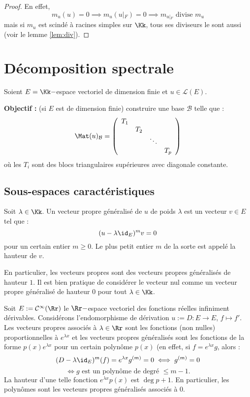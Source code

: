 \documentclass[class=report,crop=false]{standalone}
\newcommand{\Res}[1]{{\left | {}_{#1} \right.}}
\begin{document}
\begin{proof}
En effet, 
\[m_u(u) = 0 \implies m_u (u\Res{F}) = 0 \implies m_{u\Res{F}} \mbox{ divise } m_u\]
mais si $m_u$ est scindé à racines simples sur $\Kk$, tous ses diviseurs le sont aussi (voir le lemme \ref{lem:div}). 
\end{proof}


\chapter{D\'ecomposition spectrale}

Soient $E = \Kk-$espace vectoriel de dimension finie et $u \in \mathcal{L}(E)$.

{\bf Objectif :} (si $E$ est de dimension finie) construire une base $\mathcal{B}$ telle que :
$$\Mat(u)_\mathcal{B} = \left(\begin{array}{cccc}
T_1 & & &\\
 & T_2 & &\\
&&\ddots&\\
&&&T_p

\end{array}\right)
$$ où les $T_i$ sont des blocs triangulaires supérieures avec diagonale constante.

\section{Sous-espaces caract\'eristiques}

\begin{definition}
Soit $\lambda \in\Kk$.
Un vecteur propre généralisé  de $u$ de poids  $\lambda$ est un vecteur $v \in E$ tel que :
\[(u-\lambda\id_E)^m v =0\]
pour un certain entier $m \ge 0$. Le plus petit entier $m$ de la sorte est appelé la hauteur  de $v$.
\end{definition}

En particulier, les vecteurs propres sont des vecteurs propres généralisés de hauteur $1$. Il est bien pratique de considérer le vecteur nul comme un vecteur propre généralisé de hauteur $0$ pour tout $\lambda \in \Kk$.

\begin{exemple}
Soit $E:=\mathcal{C}^\infty(\Rr)$ le $\Rr-$espace vectoriel des fonctions réelles infiniment dérivables. 
Considérons l'endomorphisme de dérivation $u:= D : E \to E$, $f \mapsto f'$. Les vecteurs propres associés à $\lambda \in \Rr$ sont les fonctions (non nulles) proportionnelles à $e^{\lambda x}$ et les vecteurs propres généralisés sont les fonctions de la forme $p(x)e^{\lambda x}$ pour un certain polynôme $p(x)$ (en effet, si $f =e^{\lambda x}g$, alors :
\[(D-\lambda\id_E)^m (f)= e^{\lambda x}g^{(m)} = 0 \iff g^{(m)} = 0\]
\[\iff g \mbox{ est un polynôme de degré }\le m-1 .\]  La hauteur d'une telle fonction $e^{\lambda x}p(x)$ est $\deg p +1$. En particulier, les polynômes sont les vecteurs propres généralisés associés à $0$.
\end{exemple}
\end{document}
